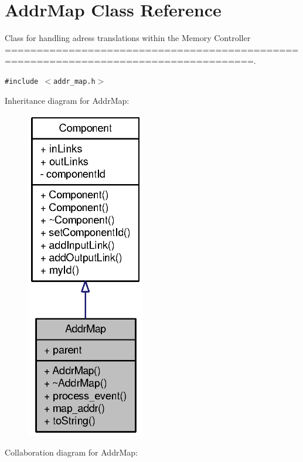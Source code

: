 \section{AddrMap Class Reference}
\label{classAddrMap}
Class for handling adress translations within the Memory Controller =====================================================================================.  


{\tt \#include $<$addr\_\-map.h$>$}

Inheritance diagram for AddrMap:\nopagebreak
\begin{figure}[H]
\begin{center}
\leavevmode
\includegraphics[width=146pt]{classAddrMap__inherit__graph}
\end{center}
\end{figure}
Collaboration diagram for AddrMap:\nopagebreak
